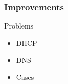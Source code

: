 \documentclass[t]{beamer}
\begin{document}
\begin{frame}[c]
    \frametitle{Improvements}
		\begin{alertblock}{Problems}
			\textcolor{blue!30!green}{
				\begin{itemize}
					\item DHCP
					\item DNS
					\item Cases
				\end{itemize}
			}
		\end{alertblock}
\end{frame}
\end{document}

